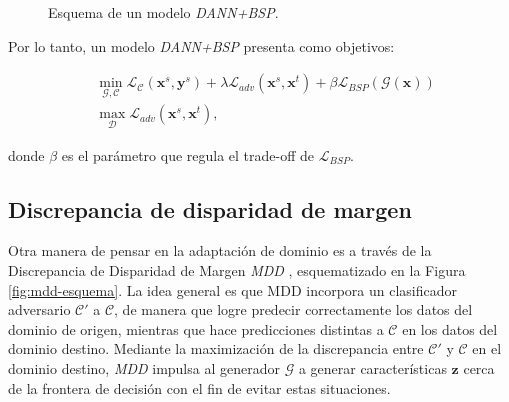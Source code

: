 \begin{figure}[H]

    \caption[Esquema de {\it DANN+BSP}]{Esquema de un modelo {\it DANN+BSP}.}
    \label{fig:bsp-esquema-dann}
\end{figure}

Por lo tanto, un modelo {\it DANN+BSP} presenta como objetivos:

\begin{align}
     & \min_{\mathcal{G},\mathcal{C}} \mathcal{L}_\mathcal{C}(\mathbf{x}^s, \mathbf{y}^s) + \lambda \mathcal{L}_{adv}(\mathbf{x}^s, \mathbf{x}^t) + \beta \mathcal{L}_{BSP}(\mathcal{G}(\mathbf{x})) \\
     & \max_{\mathcal{D}} \mathcal{L}_{adv}(\mathbf{x}^s, \mathbf{x}^t),
    \label{eq:bsp-dann-obejtivo}
\end{align}

\noindent
donde $\beta$ es el parámetro que regula el trade-off de $\mathcal{L}_{BSP}$.

\subsection{Discrepancia de disparidad de margen}

Otra manera de pensar en la adaptación de dominio es a través de la Discrepancia de Disparidad de Margen {\it MDD} \parencite{zhang2019bridging}, esquematizado en la Figura \ref{fig:mdd-esquema}. La idea general es que MDD incorpora un
clasificador adversario $\mathcal{C'}$ a $\mathcal{C}$, de manera que logre predecir correctamente los datos del
dominio de origen, mientras que hace predicciones distintas a $\mathcal{C}$ en los datos del dominio destino. Mediante
la maximización de la discrepancia entre $\mathcal{C'}$ y $\mathcal{C}$ en el dominio destino, {\it MDD} impulsa al
generador $\mathcal{G}$ a generar características $\mathbf{z}$ cerca de la frontera de decisión con el fin de evitar
estas situaciones.

